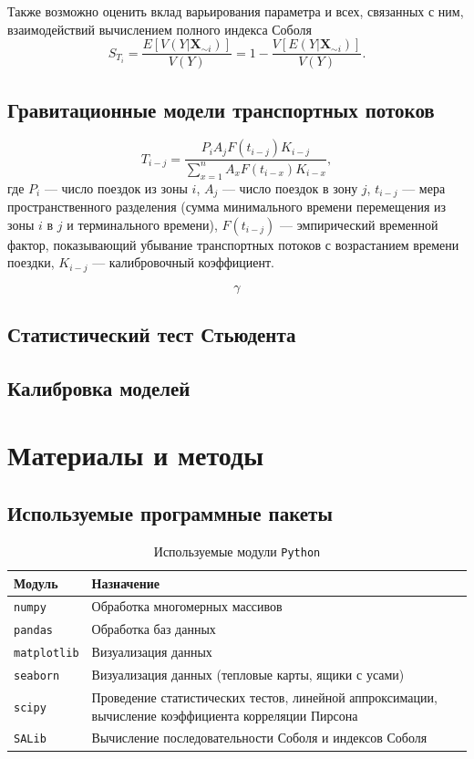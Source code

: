 \documentclass[a4paper,12pt]{article} %
\begin{document}
Также возможно оценить вклад варьирования параметра и всех, связанных с ним, взаимодействий вычислением полного индекса Соболя
\begin{displaymath}
S_{T_i}=\frac{E[V(Y|\bm{X}_{\sim i})]}{V(Y)}=1-\frac{V[E(Y|\bm{X}_{\sim i})]}{V(Y)}.
\end{displaymath}
\subsection{Гравитационные модели транспортных потоков}
\begin{displaymath}
T_{i-j}=\frac{P_iA_jF(t_{i-j})K_{i-j}}{\sum\limits_{x=1}^nA_xF(t_{i-x})K_{i-x}},
\end{displaymath}
где $P_i$ --- число поездок из зоны $i$, $A_j$ --- число поездок в зону $j$, $t_{i-j}$ --- мера пространственного разделения (сумма минимального времени перемещения из зоны $i$ в $j$ и терминального времени), $F(t_{i-j})$ --- эмпирический временной фактор, показывающий убывание транспортных потоков с возрастанием времени поездки, $K_{i-j}$ --- калибровочный коэффициент.

\begin{displaymath}
\gamma
\end{displaymath}
\subsection{Статистический тест Стьюдента}
\subsection{Калибровка моделей}


\section{Материалы и методы}
\subsection{Используемые программные пакеты}
\begin{table}[h!]
\centering
\begin{tabular}{p{4cm} p{10cm}}
\toprule
\textbf{Модуль} & \textbf{Назначение} \\
\midrule
\texttt{numpy} \cite{harris2020array} & Обработка многомерных массивов \\
\texttt{pandas} \cite{reback2020pandas} & Обработка баз данных \\
\texttt{matplotlib} \cite{Hunter:2007} & Визуализация данных \\
\texttt{seaborn} \cite{michael_waskom_2017_883859} & Визуализация данных (тепловые карты, ящики с усами) \\
\texttt{scipy} \cite{2020SciPy-NMeth} & Проведение статистических тестов, линейной аппроксимации, вычисление коэффициента корреляции Пирсона \\
\texttt{SALib} \cite{Iwanaga2022, Herman2017} & Вычисление последовательности Соболя и индексов Соболя \\
\bottomrule
\end{tabular}
\caption{Используемые модули \texttt{Python}}
\end{table}
\end{document}
